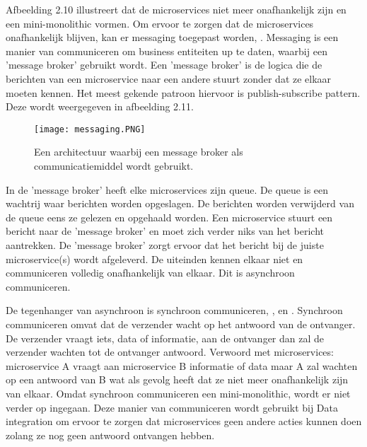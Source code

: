 Afbeelding 2.10 illustreert dat de microservices niet meer onafhankelijk zijn en een mini-monolithic vormen. Om ervoor te zorgen dat de microservices onafhankelijk blijven, kan er messaging toegepast worden, \textcite{Solance2018}. Messaging is een manier van communiceren om business entiteiten up te daten, waarbij een 'message broker' gebruikt wordt. Een 'message broker' is de logica die de berichten van een microservice naar een andere stuurt zonder dat ze elkaar moeten kennen. Het meest gekende patroon hiervoor is publish-subscribe pattern. Deze wordt weergegeven in afbeelding 2.11.
\begin{figure}[h!]
	\texttt{[image: messaging.PNG]}
	\centering
	\caption{Een architectuur waarbij een message broker als communicatiemiddel wordt gebruikt.}
\end{figure}
In de 'message broker' heeft elke microservices zijn queue. De queue is een wachtrij waar berichten worden opgeslagen. De berichten worden verwijderd van de queue eens ze gelezen en opgehaald worden. 
Een microservice stuurt een bericht naar de 'message broker' en moet zich verder niks van het bericht aantrekken. De 'message broker' zorgt ervoor dat het bericht bij de juiste microservice(s) wordt afgeleverd. De uiteinden kennen elkaar niet en communiceren volledig onafhankelijk van elkaar.
Dit is asynchroon communiceren.

De tegenhanger van asynchroon is synchroon communiceren, \textcite{Gupta2018}, \textcite{Jackson2016} en \textcite{Shore2016}.
Synchroon communiceren omvat dat de verzender wacht op het antwoord van de ontvanger. De verzender vraagt iets, data of informatie, aan de ontvanger dan zal de verzender wachten tot de ontvanger antwoord. Verwoord met microservices: microservice A vraagt aan microservice B informatie of data maar A zal wachten op een antwoord van B wat als gevolg heeft dat ze niet meer onafhankelijk zijn van elkaar. Omdat synchroon communiceren een mini-monolithic, wordt er niet verder op ingegaan. Deze manier van communiceren wordt gebruikt bij Data integration om ervoor te zorgen dat microservices geen andere acties kunnen doen zolang ze nog geen antwoord ontvangen hebben.

